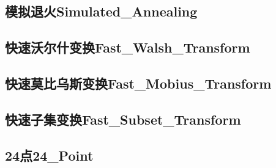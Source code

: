 \documentclass[10pt,a4paper]{article}
\begin{document}
\subsection{模拟退火Simulated\_Annealing}

\subsection{快速沃尔什变换Fast\_Walsh\_Transform}

\subsection{快速莫比乌斯变换Fast\_Mobius\_Transform}

\subsection{快速子集变换Fast\_Subset\_Transform}

\subsection{24点24\_Point}

\end{document}
